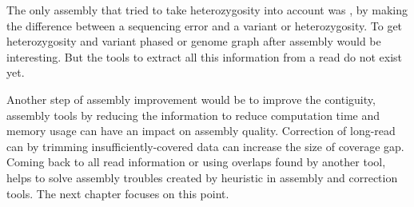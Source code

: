 \documentclass[main]{subfiles}
\begin{document}
The only assembly that tried to take heterozygosity into account was , by making the difference between a sequencing error and a variant or heterozygosity. To get heterozygosity and variant phased or genome graph after assembly would be interesting. But the tools to extract all this information from a read do not exist yet.

Another step of assembly improvement would be to improve the contiguity, assembly tools by reducing the information to reduce computation time and memory usage can have an impact on assembly quality. Correction of long-read can by trimming insufficiently-covered data can increase the size of coverage gap.
Coming back to all read information or using overlaps found by another tool, helps to solve assembly troubles created by heuristic in assembly and correction tools. The next chapter focuses on this point.
\end{document}
